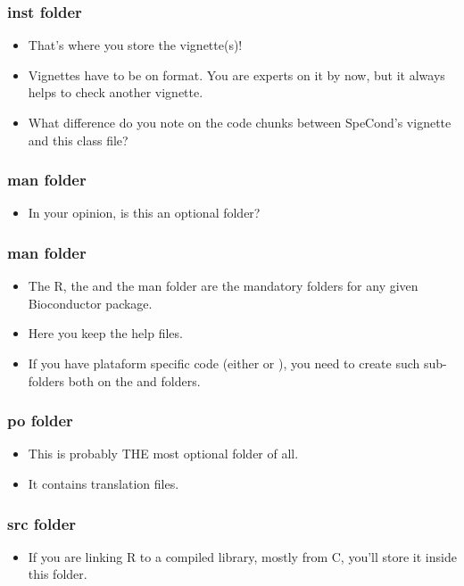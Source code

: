 \begin{frame}[allowframebreaks]
  \frametitle{inst folder}
  \begin{itemize}  
  \item That's where you store the vignette(s)!
  \item Vignettes have to be on  format. You are experts on it by now, but it always helps to check another vignette.
  \item What difference do you note on the code chunks between SpeCond's vignette and this class  file?
  \end{itemize}
\end{frame}

\begin{frame}[allowframebreaks]
  \frametitle{man folder}
  \begin{itemize}
  \item In your opinion, is this an optional folder?
  \end{itemize}
\end{frame}

\begin{frame}[allowframebreaks]
  \frametitle{man folder}
  \begin{itemize}
  \item The R, the  and the man folder are the mandatory folders for any given Bioconductor package.
  \item Here you keep the  help files.
  \item If you have plataform specific code (either  or ), you need to create such sub-folders both on the  and  folders.
  \end{itemize}
\end{frame}

\begin{frame}[allowframebreaks]
  \frametitle{po folder}
  \begin{itemize}
  \item This is probably \alert{THE} most optional folder of all. 
  \item It contains translation files.
  \end{itemize}
\end{frame}

\begin{frame}[allowframebreaks]
  \frametitle{src folder}
  \begin{itemize}
  \item If you are linking R to a compiled library, mostly from C, you'll store it inside this folder.
  \end{itemize}
\end{frame}

